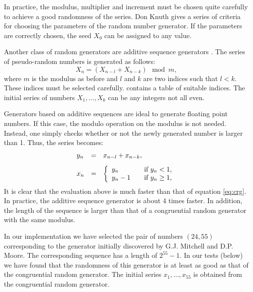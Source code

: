\documentclass[twoside]{book}
\begin{document}
In practice, the modulus, multiplier and increment must be chosen
quite carefully to achieve a good randomness of the series. Don
Knuth \cite{Knuth2} gives a series of criteria for choosing the
parameters of the random number generator. If the parameters are
correctly chosen, the seed $X_0$ can be assigned to any value.

 Another class of random
generators are additive sequence generators \cite{Knuth2}. The
series of pseudo-random numbers is generated as follows:
\begin{equation}
  X_n = \left(X_{n-l}+X_{n-k}\right) \mod m,
\end{equation}
where $m$ is the modulus as before and $l$ and $k$ are two indices
such that $l<k$. These indices must be selected carefully.
\cite{Knuth2} contains a table of suitable indices. The initial
series of numbers $X_1,\ldots,X_k$ can be any integers not all
even.

Generators based on additive sequences are ideal to generate
floating point numbers. If this case, the modulo operation on the
modulus is not needed. Instead, one simply checks whether or not
the newly generated number is larger than 1. Thus, the series
becomes:
\begin{equation}
\label{eq:addseqrandom}
  \begin{array}{lcl}
  y_n&=&x_{n-l}+x_{n-k},\\*[2ex]
  x_n&=&\left\{
    \begin{array}{ll}
    y_n&\mbox{\quad if $y_n<1$,}\\
    y_n-1&\mbox{\quad if $y_n\geq 1$,}\\
    \end{array}
  \right.
  \end{array}
\end{equation}
It is clear that the evaluation above is much faster than that of
equation \ref{eq:crg}. In practice, the additive sequence
generator is about 4 times faster. In addition, the length of the
sequence is larger than that of a  congruential random generator
with the same modulus.

In our implementation we have selected the pair of numbers
$\left(24,55\right)$ corresponding to the generator initially
discovered by G.J. Mitchell and D.P. Moore\cite{Knuth2}. The
corresponding sequence has a length of $2^{55}-1$. In our tests
(\cf below) we have found that the randomness of this generator is
at least as good as that of the congruential random generator. The
initial series $x_1,\ldots,x_{55}$ is obtained from the
congruential random generator.
\end{document}
